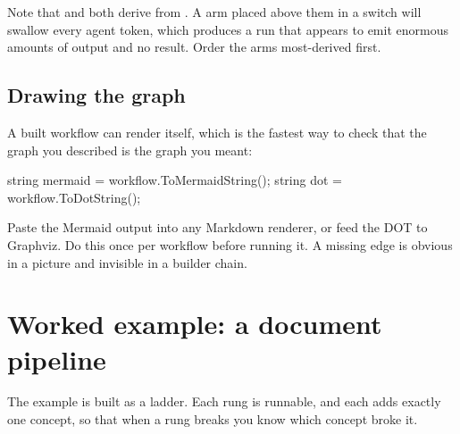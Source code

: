 Note that  and  both derive
from . A  arm placed
above them in a switch will swallow every agent token, which produces a run that
appears to emit enormous amounts of output and no result. Order the arms
most-derived first.

\subsection{Drawing the graph}

A built workflow can render itself, which is the fastest way to check that the
graph you described is the graph you meant:

\begin{csharp}[caption={Rendering the graph}, label={lst:wf-visualise}]
string mermaid = workflow.ToMermaidString();
string dot     = workflow.ToDotString();
\end{csharp}

Paste the Mermaid output into any Markdown renderer, or feed the DOT to
Graphviz. Do this once per workflow before running it. A missing edge is obvious
in a picture and invisible in a builder chain.


\section{Worked example: a document pipeline}
\label{sec:wf-pipeline}

The example is built as a ladder. Each rung is runnable, and each adds exactly
one concept, so that when a rung breaks you know which concept broke it.

